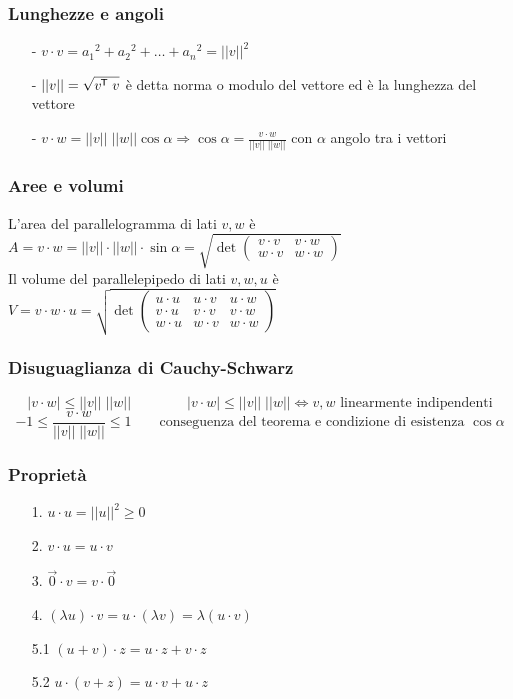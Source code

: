 \documentclass[a4paper]{article}
\newcommand\tran{^{\mkern-1.5mu\mathsf{T}}} %
\begin{document}
\subsubsection*{Lunghezze e angoli}
\begin{itemize}[topsep=3pt, itemsep=0pt]
	\item[-] \(v \cdot v = {a_1}^2 + {a_2}^2 + \dots + {a_n}^2 = ||v||^2\)
	\item[-] \(||v|| = \sqrt{v \tran \; v}\) è detta norma o modulo del vettore ed è la lunghezza del vettore
	\item[-] \(v \cdot w = ||v|| \; ||w|| \cos \alpha \Rightarrow \cos \alpha = \displaystyle \frac{v \cdot w}{||v|| \; ||w||}\) con \(\alpha\) angolo tra i vettori
\end{itemize}

\subsubsection*{Aree e volumi}
L'area del parallelogramma di lati \(v, w\) è \(A = v \cdot w = ||v|| \cdot ||w|| \cdot \sin \alpha = \sqrt{\det \left( \begin{matrix} v \cdot v & v \cdot w \\ w \cdot v & w \cdot w \end{matrix} \right)}\) \\
Il volume del parallelepipedo di lati \(v, w, u\) è \(V = v \cdot w \cdot u = \sqrt{ \det \left( \begin{matrix} u \cdot u & u \cdot v & u \cdot w \\ v \cdot u & v \cdot v & v \cdot w \\ w \cdot u & w \cdot v & w \cdot w \end{matrix} \right)}\)

\subsubsection*{Disuguaglianza di Cauchy-Schwarz}
\[|v \cdot w| \leq ||v|| \; ||w|| \qquad \qquad |v \cdot w| \leq ||v|| \; ||w|| \Leftrightarrow v, w \text{ linearmente indipendenti}\]
\[-1 \leq \frac{v \cdot w}{||v|| \; ||w||} \leq 1 \qquad \text{conseguenza del teorema e condizione di esistenza } \cos \alpha\]

\subsubsection*{Proprietà}
\begin{enumerate}
	\item[1.] \(u \cdot u = ||u||^2 \geq 0\)
	\item[2.] \(v \cdot u = u \cdot v\)
	\item[3.] \(\vec{0} \cdot v = v \cdot \vec{0}\)
	\item[4.] \((\lambda u) \cdot v = u \cdot (\lambda v) = \lambda (u \cdot v)\)
	\item[5.1] \((u + v) \cdot z = u \cdot z + v \cdot z\)
	\item[5.2] \(u \cdot (v + z) = u \cdot v + u \cdot z\)
\end{enumerate}
\end{document}
